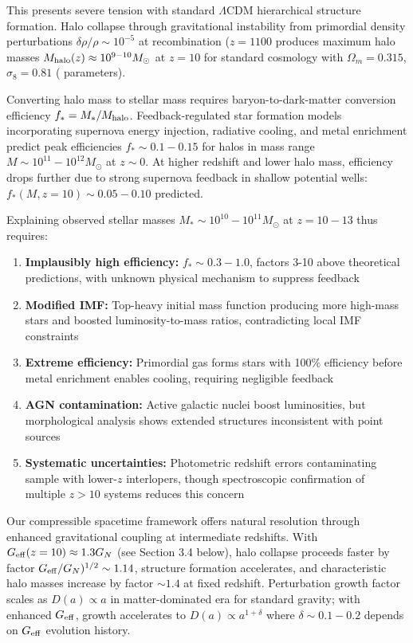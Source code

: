 \documentclass[11pt,a4paper]{article}
\providecommand{\tightlist}{\setlength{\itemsep}{0pt}\setlength{\parskip}{0pt}}
\begin{document}
This presents severe tension with standard \(\Lambda\)CDM \cite{Dodelson2021} hierarchical
structure formation. Halo collapse through gravitational instability
from primordial density perturbations \(\delta\rho/\rho \sim 10^{-5}\)
at recombination (\(z = 1100\) produces maximum halo masses
\(M_{\rm halo}(z) \approx 10^{9-10} M_\odot\) at \(z = 10\) for standard
cosmology with \(\Omega_m = 0.315\), \(\sigma_8 = 0.81\) (\cite{PlanckCollaboration2020a}
parameters).

Converting halo mass to stellar mass requires baryon-to-dark-matter
conversion efficiency \(f_* = M_*/M_{\rm halo}\). Feedback-regulated
star formation models incorporating supernova energy injection,
radiative cooling, and metal enrichment predict peak efficiencies
\(f_* \sim 0.1-0.15\) for halos in mass range
\(M \sim 10^{11}-10^{12} M_\odot\) at \(z \sim 0\). At higher redshift
and lower halo mass, efficiency drops further due to strong supernova
feedback in shallow potential wells: \(f_*(M, z=10) \sim 0.05-0.10\)
predicted.

Explaining observed stellar masses \(M_* \sim 10^{10}-10^{11} M_\odot\)
at \(z = 10-13\) thus requires:

\begin{enumerate}
\def\labelenumi{\arabic{enumi}.}
\tightlist
\item
  \textbf{Implausibly high efficiency:} \(f_* \sim 0.3-1.0\), factors
  3-10 above theoretical predictions, with unknown physical mechanism to
  suppress feedback
\item
  \textbf{Modified IMF:} Top-heavy initial mass function producing more
  high-mass stars and boosted luminosity-to-mass ratios, contradicting
  local IMF constraints
\item
  \textbf{Extreme efficiency:} Primordial gas forms stars with 100\%
  efficiency before metal enrichment enables cooling, requiring
  negligible feedback
\item
  \textbf{AGN contamination:} Active galactic nuclei boost luminosities,
  but morphological analysis shows extended structures inconsistent with
  point sources
\item
  \textbf{Systematic uncertainties:} Photometric redshift errors
  contaminating sample with lower-\(z\) interlopers, though
  spectroscopic confirmation of multiple \(z > 10\) systems reduces this
  concern
\end{enumerate}

Our compressible spacetime framework offers natural resolution through
enhanced gravitational coupling at intermediate redshifts. With
\(G_{\rm eff}(z=10) \approx 1.3 G_N\) (see Section 3.4 below), halo
collapse proceeds faster by factor
\(G_{\rm eff}/G_N)^{1/2} \sim 1.14\), structure formation accelerates,
and characteristic halo masses increase by factor \(\sim 1.4\) at fixed
redshift. Perturbation growth factor scales as \(D(a) \propto a\) in
matter-dominated era for standard gravity; with enhanced
\(G_{\rm eff}\), growth accelerates to \(D(a) \propto a^{1+\delta}\)
where \(\delta \sim 0.1-0.2\) depends on \(G_{\rm eff}\) evolution
history.
\end{document}
